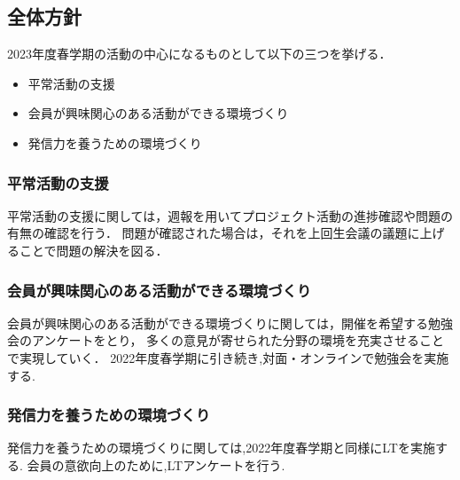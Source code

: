 \subsection*{全体方針}


2023年度春学期の活動の中心になるものとして以下の三つを挙げる．

\begin{itemize}
    \item 平常活動の支援
    \item 会員が興味関心のある活動ができる環境づくり
    \item 発信力を養うための環境づくり
\end{itemize}

\subsubsection*{平常活動の支援}
平常活動の支援に関しては，週報を用いてプロジェクト活動の進捗確認や問題の有無の確認を行う．
問題が確認された場合は，それを上回生会議の議題に上げることで問題の解決を図る．

\subsubsection*{会員が興味関心のある活動ができる環境づくり}
会員が興味関心のある活動ができる環境づくりに関しては，開催を希望する勉強会のアンケートをとり，
多くの意見が寄せられた分野の環境を充実させることで実現していく．
2022年度春学期に引き続き,対面・オンラインで勉強会を実施する.

\subsubsection*{発信力を養うための環境づくり}
発信力を養うための環境づくりに関しては,2022年度春学期と同様にLTを実施する.
会員の意欲向上のために,LTアンケートを行う.